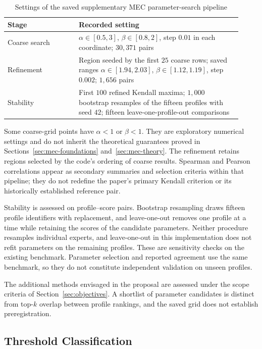 \documentclass{article}
\theoremstyle{plain}
\theoremstyle{remark}
\begin{document}
\begin{table}[htbp]
\centering
\caption{Settings of the saved supplementary MEC parameter-search pipeline}
\label{tab:methods-search}
\small
\begin{tabular}{@{}p{0.28\linewidth}p{0.64\linewidth}@{}}
\toprule
Stage & Recorded setting\\
\midrule
Coarse search & $\alpha\in[0.5,3]$, $\beta\in[0.8,2]$, step $0.01$ in each coordinate; $30{,}371$ pairs\\
Refinement & Region seeded by the first $25$ coarse rows; saved ranges $\alpha\in[1.94,2.03]$, $\beta\in[1.12,1.19]$, step $0.002$; $1{,}656$ pairs\\
Stability & First $100$ refined Kendall maxima; $1{,}000$ bootstrap resamples of the fifteen profiles with seed $42$; fifteen leave-one-profile-out comparisons\\
\bottomrule
\end{tabular}
\end{table}

Some coarse-grid points have $\alpha<1$ or $\beta<1$. They are exploratory numerical settings and do not inherit the theoretical guarantees proved in Sections~\ref{sec:mec-foundations} and~\ref{sec:mec-theory}. The refinement retains regions selected by the code's ordering of coarse results. Spearman and Pearson correlations appear as secondary summaries and selection criteria within that pipeline; they do not redefine the paper's primary Kendall criterion or its historically established reference pair.

Stability is assessed on profile--score pairs. Bootstrap resampling draws fifteen profile identifiers with replacement, and leave-one-out removes one profile at a time while retaining the scores of the candidate parameters. Neither procedure resamples individual experts, and leave-one-out in this implementation does not refit parameters on the remaining profiles. These are sensitivity checks on the existing benchmark. Parameter selection and reported agreement use the same benchmark, so they do not constitute independent validation on unseen profiles.

The additional methods envisaged in the proposal are assessed under the scope criteria of Section~\ref{sec:objectives}. A shortlist of parameter candidates is distinct from top-$k$ overlap between profile rankings, and the saved grid does not establish preregistration.

\subsection{Threshold Classification}\label{subsec:methods-thresholds}
\end{document}
